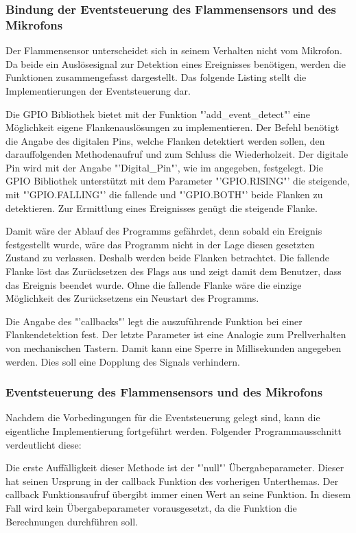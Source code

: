\subsubsection*{Bindung der Eventsteuerung des Flammensensors und des Mikrofons}
	Der Flammensensor unterscheidet sich in seinem Verhalten nicht vom Mikrofon. Da beide ein Auslösesignal zur Detektion eines Ereignisses benötigen, werden die Funktionen zusammengefasst dargestellt. Das folgende Listing stellt die Implementierungen der Eventsteuerung dar.
	
	Die GPIO Bibliothek bietet mit der Funktion "'add\_event\_detect"' eine Möglichkeit eigene Flankenauslösungen zu implementieren. Der Befehl benötigt die Angabe des digitalen Pins, welche Flanken detektiert werden sollen, den darauffolgenden Methodenaufruf und zum Schluss die Wiederholzeit. Der digitale Pin wird mit der Angabe "'Digital\_Pin"', wie im  angegeben, festgelegt. Die GPIO Bibliothek unterstützt mit dem Parameter "'GPIO.RISING"' die steigende, mit "'GPIO.FALLING"' die fallende und "'GPIO.BOTH"' beide Flanken zu detektieren. Zur Ermittlung eines Ereignisses genügt die steigende Flanke. 
	
	Damit wäre der Ablauf des Programms gefährdet, denn sobald ein Ereignis festgestellt wurde, wäre das Programm nicht in der Lage diesen gesetzten Zustand zu verlassen. Deshalb werden beide Flanken betrachtet. Die fallende Flanke löst das Zurücksetzen des Flags aus und zeigt damit dem Benutzer, dass das Ereignis beendet wurde. Ohne die fallende Flanke wäre die einzige Möglichkeit des Zurücksetzens ein Neustart des Programms. 
	
	Die Angabe des "'callbacks"' legt die auszuführende Funktion bei einer Flankendetektion fest. Der letzte Parameter ist eine Analogie zum Prellverhalten von mechanischen Tastern. Damit kann eine Sperre in Millisekunden angegeben werden. Dies soll eine Dopplung des Signals verhindern.
\subsubsection*{Eventsteuerung des Flammensensors und des Mikrofons}
	Nachdem die Vorbedingungen für die Eventsteuerung gelegt sind, kann die eigentliche Implementierung fortgeführt werden. Folgender Programmausschnitt verdeutlicht diese:
	
	Die erste Auffälligkeit dieser Methode ist der "'null"' Übergabeparameter. Dieser hat seinen Ursprung in der callback Funktion des vorherigen Unterthemas. Der callback Funktionsaufruf übergibt immer einen Wert an seine Funktion. In diesem Fall wird kein Übergabeparameter vorausgesetzt, da die Funktion die Berechnungen durchführen soll. 
	
